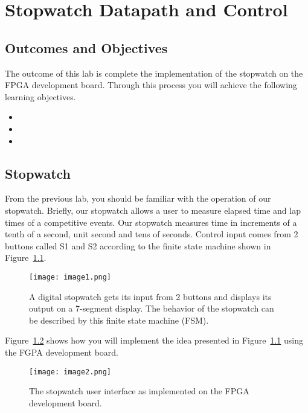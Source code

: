 \chapter{Stopwatch Datapath and Control}
\label{chapter:swDpAndCu}
\graphicspath{ {./Lab11Stopwatch/Fig} }

\section{Outcomes and Objectives}

The outcome of this lab is complete the implementation
of the stopwatch  on the FPGA development board.
Through this process you will achieve the following
learning objectives.
\begin{itemize}
	\item {}
	\item {}
	\item {}
\end{itemize}



\section{Stopwatch}

From the previous lab, you should be familiar with the operation of our
stopwatch. Briefly, our stopwatch allows a user to measure elapsed time
and lap times of a competitive events. Our stopwatch measures time in
increments of a tenth of a second, unit second and tens of seconds.
Control input comes from 2 buttons called S1 and S2 according to the
finite state machine shown in Figure~\ref{fig:swHighLevel}.

\begin{figure}[ht]
\texttt{[image: image1.png]}
\caption{A digital stopwatch gets its input from 2 buttons and displays
its output on a 7-segment display. The behavior of the stopwatch can be
described by this finite state machine (FSM).}
\label{fig:swHighLevel}
\end{figure}

Figure~\ref{fig:swDevBoard} shows how you will implement the idea presented in Figure~\ref{fig:swHighLevel}
using the FGPA development board.

\begin{figure}[ht]
\texttt{[image: image2.png]}
\caption{The stopwatch user interface as implemented on the FPGA
development board.}
\label{fig:swDevBoard}
\end{figure}

